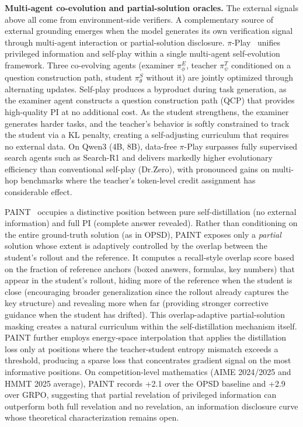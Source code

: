 \documentclass{article} %
\begin{document}
\textbf{Multi-agent co-evolution and partial-solution oracles.} The external signals above all come from environment-side verifiers. A complementary source of external grounding emerges when the model generates its own verification signal through multi-agent interaction or partial-solution disclosure. $\pi$-Play~\citep{2604.14054} unifies privileged information and self-play within a single multi-agent self-evolution framework. Three co-evolving agents (examiner $\pi^E_\phi$, teacher $\pi^T_\psi$ conditioned on a question construction path, student $\pi^S_\theta$ without it) are jointly optimized through alternating updates. Self-play produces a byproduct during task generation, as the examiner agent constructs a question construction path (QCP) that provides high-quality PI at no additional cost. As the student strengthens, the examiner generates harder tasks, and the teacher's behavior is softly constrained to track the student via a KL penalty, creating a self-adjusting curriculum that requires no external data. On Qwen3 (4B, 8B), data-free $\pi$-Play surpasses fully supervised search agents such as Search-R1 and delivers markedly higher evolutionary efficiency than conventional self-play (Dr.Zero), with pronounced gains on multi-hop benchmarks where the teacher's token-level credit assignment has considerable effect.

PAINT~\citep{2604.26573} occupies a distinctive position between pure self-distillation (no external information) and full PI (complete answer revealed). Rather than conditioning on the entire ground-truth solution (as in OPSD), PAINT exposes only a \emph{partial} solution whose extent is adaptively controlled by the overlap between the student's rollout and the reference. It computes a recall-style overlap score based on the fraction of reference anchors (boxed answers, formulas, key numbers) that appear in the student's rollout, hiding more of the reference when the student is close (encouraging broader generalization since the rollout already captures the key structure) and revealing more when far (providing stronger corrective guidance when the student has drifted). This overlap-adaptive partial-solution masking creates a natural curriculum within the self-distillation mechanism itself. PAINT further employs energy-space interpolation that applies the distillation loss only at positions where the teacher-student entropy mismatch exceeds a threshold, producing a sparse loss that concentrates gradient signal on the most informative positions. On competition-level mathematics (AIME 2024/2025 and HMMT 2025 average), PAINT records +2.1 over the OPSD baseline and +2.9 over GRPO, suggesting that partial revelation of privileged information can outperform both full revelation and no revelation, an information disclosure curve whose theoretical characterization remains open.
\end{document}
